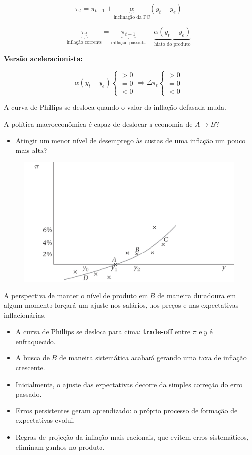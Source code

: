 \documentclass[a4paper,12pt]{article}[abntex2]
\begin{document}
\[
\pi_t = \pi_{t-1} + \underbrace{\alpha}_\text{inclinação da PC} (y_t - y_e)
\]

\[
\underbrace{\pi_t}_{\text{inflação corrente}} = \underbrace{\pi_{t-1}}_{\text{inflação passada}} + \underbrace{\alpha (y_t - y_e)}_{\text{hiato do produto}}
\]

\textbf{Versão aceleracionista:}

\[
\alpha (y_t - y_e) \begin{cases} 
> 0 \\ 
= 0 \\ 
< 0 
\end{cases} 
\Rightarrow \Delta \pi_t 
\begin{cases} 
> 0 \\ 
= 0 \\ 
< 0 
\end{cases}
\]

A curva de Phillips se desloca quando o valor da inflação defasada muda.

A política macroeconômica é capaz de deslocar a economia de \( A \to B \)? \begin{itemize}
    \item Atingir um menor nível de desemprego às custas de uma inflação um pouco mais alta?
\end{itemize}

\begin{figure}[H]
    \centering
    \includegraphics[width=0.7\linewidth]{Imagens/a9i3.png}
\end{figure}


A perspectiva de manter o nível de produto em \( B \) de maneira duradoura em algum momento forçará um ajuste nos salários, nos preços e nas expectativas inflacionárias. \begin{itemize}
    \item A curva de Phillips se desloca para cima: \textbf{trade-off} entre \( \pi \) e \( y \) é enfraquecido.
    \item A busca de \( B \) de maneira sistemática acabará gerando uma taxa de inflação crescente.
    \item Inicialmente, o ajuste das expectativas decorre da simples correção do erro passado.
    \item Erros persistentes geram aprendizado: o próprio processo de formação de expectativas evolui.
    \item Regras de projeção da inflação mais racionais, que evitem erros sistemáticos, eliminam ganhos no produto.
\end{itemize}
\end{document}
